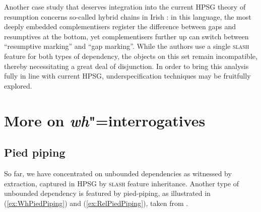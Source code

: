 \documentclass[output=paper
                ,modfonts
                ,nonflat
	        ,collection
	        ,collectionchapter
	        ,collectiontoclongg
 	        ,biblatex
                ,babelshorthands
                ,newtxmath
                ,draftmode
                ,colorlinks, citecolor=brown
]{./langsci/langscibook}
\begin{document}
{Another case study that deserves integration into the current HPSG theory of resumption concerns so-called hybrid chains in Irish \citep{assmann10:_does_chain_hybrid_irish_suppor}: in this language,  the most deeply embedded complementisers register the difference between gaps and resumptives at the bottom, yet complementisers further up can switch between ``resumptive marking'' and ``gap marking''. While the authors use a single \textsc{slash} feature for both types of dependency, the objects on this set remain incompatible, thereby necessitating a great deal of disjunction. In order to bring this analysis fully in line with current HPSG,  underspecification techniques may be fruitfully explored.  



\section{More on \emph{wh}"=interrogatives}
\label{sec:UDC:MoreWh}

\subsection{Pied piping}

So far, we have concentrated on unbounded dependencies as witnessed by extraction, captured in HPSG by \textsc{slash} feature inheritance. Another type of unbounded dependency is featured by pied-piping, as illustrated in (\ref{ex:WhPiedPiping}) and (\ref{ex:RelPiedPiping}), taken from \citet{Ginzburg:Sag:01}. 

\begin{exe}
  \ex \label{ex:WhPiedPiping}
  \begin{xlist}
  \end{xlist}
\end{exe}

}
\end{document}
